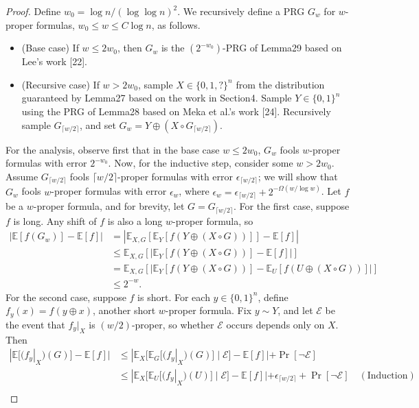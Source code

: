 \documentclass[10pt,a4paper]{article}
\begin{document}
\begin{proof}
Define $w_0=\log n/(\log\log n)^2$. We recursively define a PRG $G_w$ for $w$-proper formulas, $w_0\le w\le C\log n$, as follows.
\begin{itemize}
\item (Base case) If $w\le2w_0$, then $G_w$ is the $(2^{-w_0})$-PRG of Lemma29 based on Lee's work [22].
\item (Recursive case) If $w>2w_0$, sample $X\in\{0,1,?\}^n$ from the distribution guaranteed by Lemma27 based on the work in Section4. Sample $Y\in\{0,1\}^n$ using the PRG of Lemma28 based on Meka et al.'s work [24]. Recursively sample $G_{\lceil w/2\rceil}$, and set $G_w=Y\oplus(X\circ G_{\lceil w/2\rceil})$.
\end{itemize}
For the analysis, observe first that in the base case $w\le2w_0$, $G_w$ fools $w$-proper formulas with error $2^{-w_0}$. Now, for the inductive step, consider some $w>2w_0$. Assume $G_{\lceil w/2\rceil}$ fools $\lceil w/2\rceil$-proper formulas with error $\epsilon_{\lceil w/2\rceil}$; we will show that $G_w$ fools $w$-proper formulas with error $\epsilon_w$, where $\epsilon_w=\epsilon_{\lceil w/2\rceil}+2^{-\Omega(w/\log w)}$.
Let $f$ be a $w$-proper formula, and for brevity, let $G=G_{\lceil w/2\rceil}$. For the first case, suppose $f$ is long. Any shift of $f$ is also a long $w$-proper formula, so
\begin{align*}
|\mathbb E[f(G_w)]-\mathbb E[f]|
&=\left|\mathbb E_{X,G}[\mathbb E_Y[f(Y\oplus(X\circ G))]]-\mathbb E[f]\right|\\
&\le\mathbb E_{X,G}[|\mathbb E_Y[f(Y\oplus(X\circ G))]-\mathbb E[f]|]\\
&=\mathbb E_{X,G}[|\mathbb E_Y[f(Y\oplus(X\circ G))]-\mathbb E_U[f(U\oplus(X\circ G))]|]\\
&\le2^{-w}.
\end{align*}
For the second case, suppose $f$ is short. For each $y\in\{0,1\}^n$, define $f_y(x)=f(y\oplus x)$, another short $w$-proper formula. Fix $y\sim Y$, and let $\mathcal E$ be the event that $f_y|_X$ is $(w/2)$-proper, so whether $\mathcal E$ occurs depends only on $X$. Then
\begin{align*}
|\mathbb E[(f_y|_X)(G)]-\mathbb E[f]|
&\le|\mathbb E_X[\mathbb E_G[(f_y|_X)(G)]\mid\mathcal E]-\mathbb E[f]|+\Pr[\neg\mathcal E]\\
&\le|\mathbb E_X[\mathbb E_U[(f_y|_X)(U)]\mid\mathcal E]-\mathbb E[f]|
+\epsilon_{\lceil w/2\rceil}+\Pr[\neg\mathcal E]\quad(\text{Induction})\\

\end{align*}
\end{proof}
\end{document}
